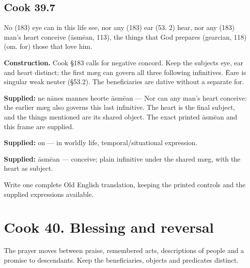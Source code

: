 \par\begin{minipage}{\linewidth}\raggedright
\subsection*{Cook 39.7}

No (183) eye can in this life see, nor any (183) ear (53. 2) hear, nor any (183) man’s heart conceive (āsmēan, 113), the things that God prepares (gearcian, 118) (om. for) those that love him.

\end{minipage}\par\addvspace{4pt}

\textbf{Construction.} Cook §183 calls for negative concord. Keep the subjects eye, ear and heart distinct; the first mæg can govern all three following infinitives. Ēare is singular weak neuter (§53.2). The beneficiaries are dative without a separate for.

\textbf{Supplied:} ne nānes mannes heorte āsmēan — Nor can any man’s heart conceive: the earlier mæg also governs this last infinitive. The heart is the final subject, and the things mentioned are its shared object. The exact printed āsmēan and this frame are supplied.

\textbf{Supplied:} on — in worldly life, temporal/\allowbreak{}situational expression.

\textbf{Supplied:} āsmēan — conceive; plain infinitive under the shared mæg, with the heart as subject.

Write one complete Old English translation, keeping the printed controls and the supplied expressions available.

\section*{Cook 40. Blessing and reversal}

The prayer moves between praise, remembered acts, descriptions of people and a promise to descendants. Keep the beneficiaries, objects and predicates distinct.

